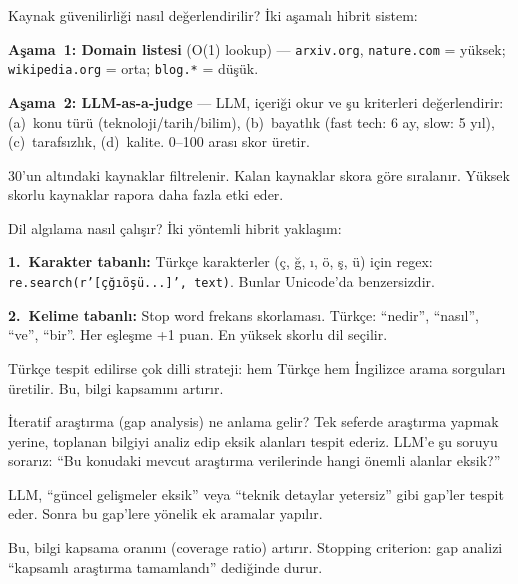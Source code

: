 \begin{mulakat}{Kaynak g\"{u}venilirli\u{g}i nas{\i}l de\u{g}erlendirilir?}
\.{I}ki a\c{s}amal{\i} hibrit sistem:

\textbf{A\c{s}ama~1: Domain listesi} (O(1) lookup) --- \texttt{arxiv.org}, \texttt{nature.com} = y\"{u}ksek; \texttt{wikipedia.org} = orta; \texttt{blog.*} = d\"{u}\c{s}\"{u}k.

\textbf{A\c{s}ama~2: LLM-as-a-judge} --- LLM, i\c{c}eri\u{g}i okur ve \c{s}u kriterleri de\u{g}erlendirir: (a)~konu t\"{u}r\"{u} (teknoloji/tarih/bilim), (b)~bayatl{\i}k (fast tech: 6 ay, slow: 5 y{\i}l), (c)~tarafs{\i}zl{\i}k, (d)~kalite. 0--100 aras{\i} skor \"{u}retir.

30'un alt{\i}ndaki kaynaklar filtrelenir. Kalan kaynaklar skora g\"{o}re s{\i}ralan{\i}r. Y\"{u}ksek skorlu kaynaklar rapora daha fazla etki eder.
\end{mulakat}

\begin{mulakat}{Dil alg{\i}lama nas{\i}l \c{c}al{\i}\c{s}{\i}r?}
\.{I}ki y\"{o}ntemli hibrit yakla\c{s}{\i}m:

\textbf{1.~Karakter tabanl{\i}:} T\"{u}rk\c{c}e karakterler (\c{c}, \u{g}, {\i}, \"{o}, \c{s}, \"{u}) i\c{c}in regex: \texttt{re.search(r'[\c{c}\u{g}{\i}\"{o}\c{s}\"{u}...]', text)}. Bunlar Unicode'da benzersizdir.

\textbf{2.~Kelime tabanl{\i}:} Stop word frekans skorlamas{\i}. T\"{u}rk\c{c}e: ``nedir'', ``nas{\i}l'', ``ve'', ``bir''. Her e\c{s}le\c{s}me +1 puan. En y\"{u}ksek skorlu dil se\c{c}ilir.

T\"{u}rk\c{c}e tespit edilirse \c{c}ok dilli strateji: hem T\"{u}rk\c{c}e hem \.{I}ngilizce arama sorgular{\i} \"{u}retilir. Bu, bilgi kapsam{\i}n{\i} art{\i}r{\i}r.
\end{mulakat}

\begin{mulakat}{\.{I}teratif ara\c{s}t{\i}rma (gap analysis) ne anlama gelir?}
Tek seferde ara\c{s}t{\i}rma yapmak yerine, toplanan bilgiyi analiz edip eksik alanlar{\i} tespit ederiz. LLM'e \c{s}u soruyu sorar{\i}z: ``Bu konudaki mevcut ara\c{s}t{\i}rma verilerinde hangi \"{o}nemli alanlar eksik?''

LLM, ``g\"{u}ncel geli\c{s}meler eksik'' veya ``teknik detaylar yetersiz'' gibi gap'ler tespit eder. Sonra bu gap'lere y\"{o}nelik ek aramalar yap{\i}l{\i}r.

Bu, bilgi kapsama oran{\i}n{\i} (coverage ratio) art{\i}r{\i}r. Stopping criterion: gap analizi ``kapsaml{\i} ara\c{s}t{\i}rma tamamland{\i}'' dedi\u{g}inde durur.
\end{mulakat}

